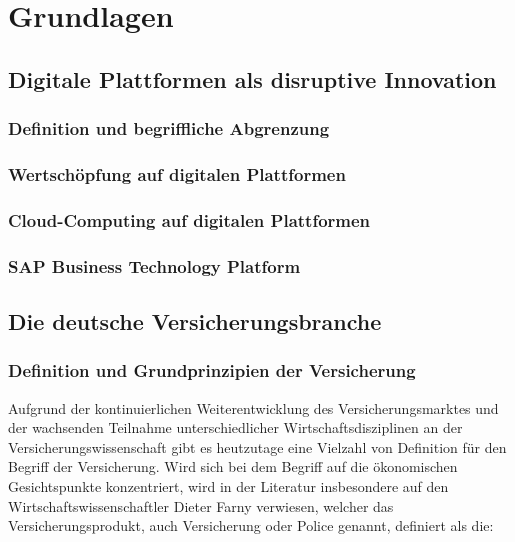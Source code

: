 \chapter{Grundlagen}

\section{Digitale Plattformen als disruptive Innovation}

\subsection{Definition und begriffliche Abgrenzung}

\newpage

\subsection{Wertschöpfung auf digitalen Plattformen}

\newpage

\subsection{Cloud-Computing auf digitalen Plattformen}

\newpage

\subsection{SAP Business Technology Platform}


\newpage


\section{Die deutsche Versicherungsbranche}

\subsection{Definition und Grundprinzipien der Versicherung}

Aufgrund der kontinuierlichen Weiterentwicklung des Versicherungsmarktes und der wachsenden Teilnahme unterschiedlicher Wirtschaftsdisziplinen an der Versicherungswissenschaft gibt es heutzutage eine Vielzahl von Definition für den Begriff der Versicherung. Wird sich bei dem Begriff auf die ökonomischen Gesichtspunkte konzentriert, wird in der Literatur insbesondere auf den Wirtschaftswissenschaftler Dieter Farny verwiesen, welcher das Versicherungsprodukt, auch Versicherung oder Police genannt, definiert als die: 

